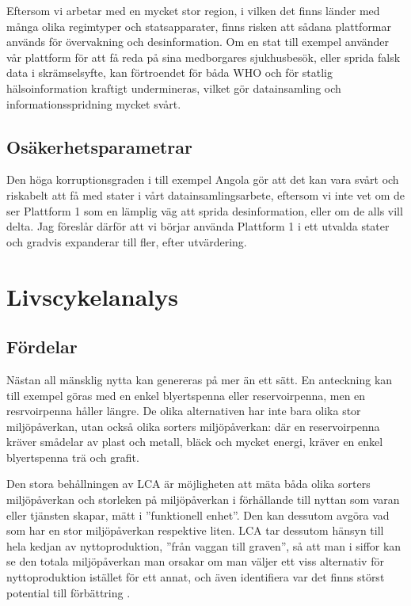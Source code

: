 \documentclass{article}
\begin{document}
Eftersom vi arbetar med en mycket stor region, i vilken det finns länder med många olika regimtyper och statsapparater, finns risken att sådana plattformar används för övervakning och desinformation. Om en stat till exempel använder vår plattform för att få reda på sina medborgares sjukhusbesök, eller sprida falsk data i skrämselsyfte, kan förtroendet för båda WHO och för statlig hälsoinformation kraftigt undermineras, vilket gör datainsamling och informationsspridning mycket svårt.

\subsection{Osäkerhetsparametrar}

Den höga korruptionsgraden i till exempel Angola  gör att det kan vara svårt och riskabelt att få med stater i vårt datainsamlingsarbete, eftersom vi inte vet om de ser Plattform 1 som en lämplig väg att sprida desinformation, eller om de alls vill delta. Jag föreslår därför att vi börjar använda Plattform 1 i ett utvalda stater och gradvis expanderar till fler, efter utvärdering.





\clearpage
\section{Livscykelanalys}

\subsection{Fördelar}

Nästan all mänsklig nytta kan genereras på mer än ett sätt. En anteckning kan till exempel göras med en enkel blyertspenna eller reservoirpenna, men en resrvoirpenna håller längre. De olika alternativen har inte bara olika stor miljöpåverkan, utan också olika sorters miljöpåverkan: där en reservoirpenna kräver smådelar av plast och metall, bläck och mycket energi, kräver en enkel blyertspenna trä och grafit. 

Den stora behållningen av LCA är möjligheten att mäta båda olika sorters miljöpåverkan och storleken på miljöpåverkan i förhållande till nyttan som varan eller tjänsten skapar, mätt i ''funktionell enhet''. Den kan dessutom avgöra vad som har en stor miljöpåverkan respektive liten. LCA tar dessutom hänsyn till hela kedjan av nyttoproduktion, ''från vaggan till graven'', så att man i siffor kan se den totala miljöpåverkan man orsakar om man väljer ett viss alternativ för nyttoproduktion istället för ett annat, och även identifiera var det finns störst potential till förbättring  .
\end{document}
